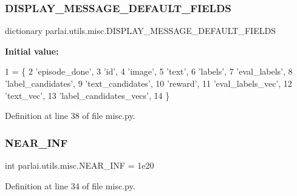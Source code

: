 \subsubsection{\texorpdfstring{D\+I\+S\+P\+L\+A\+Y\+\_\+\+M\+E\+S\+S\+A\+G\+E\+\_\+\+D\+E\+F\+A\+U\+L\+T\+\_\+\+F\+I\+E\+L\+DS}{DISPLAY\_MESSAGE\_DEFAULT\_FIELDS}}
{\footnotesize\ttfamily dictionary parlai.\+utils.\+misc.\+D\+I\+S\+P\+L\+A\+Y\+\_\+\+M\+E\+S\+S\+A\+G\+E\+\_\+\+D\+E\+F\+A\+U\+L\+T\+\_\+\+F\+I\+E\+L\+DS}

{\bfseries Initial value\+:}
\begin{DoxyCode}
1 =  \{
2     \textcolor{stringliteral}{'episode\_done'},
3     \textcolor{stringliteral}{'id'},
4     \textcolor{stringliteral}{'image'},
5     \textcolor{stringliteral}{'text'},
6     \textcolor{stringliteral}{'labels'},
7     \textcolor{stringliteral}{'eval\_labels'},
8     \textcolor{stringliteral}{'label\_candidates'},
9     \textcolor{stringliteral}{'text\_candidates'},
10     \textcolor{stringliteral}{'reward'},
11     \textcolor{stringliteral}{'eval\_labels\_vec'},
12     \textcolor{stringliteral}{'text\_vec'},
13     \textcolor{stringliteral}{'label\_candidates\_vecs'},
14 \}
\end{DoxyCode}


Definition at line 38 of file misc.\+py.

\mbox{\label{namespaceparlai_1_1utils_1_1misc_a7f43cea0de3a37889ef23f275831ff92}} 
\subsubsection{\texorpdfstring{N\+E\+A\+R\+\_\+\+I\+NF}{NEAR\_INF}}
{\footnotesize\ttfamily int parlai.\+utils.\+misc.\+N\+E\+A\+R\+\_\+\+I\+NF = 1e20}



Definition at line 34 of file misc.\+py.

\mbox{\label{namespaceparlai_1_1utils_1_1misc_a8f8b31dbd6331077648288e004f45ff9}} 
